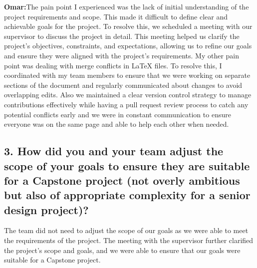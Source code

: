 \documentclass{article}
\begin{document}
\newline
\newline
\textbf{Omar:}The pain point I experienced was the lack of initial understanding of the project requirements and scope. This made it difficult to define clear and achievable goals for the project. To resolve this, we scheduled a meeting with our supervisor to discuss the project in detail. This meeting helped us clarify the project's objectives, constraints, and expectations, allowing us to refine our goals and ensure they were aligned with the project's requirements. My other pain point was dealing with merge conflicts in LaTeX files. To resolve this, I coordinated with my team members to ensure that we were working on separate sections of the document and regularly communicated about changes to avoid overlapping edits. Also we maintained a clear version control strategy to manage contributions effectively while having a pull request review process to catch any potential conflicts early and we were in constant communication to ensure everyone was on the same page and able to help each other when needed.


\subsection*{3. How did you and your team adjust the scope of your goals to ensure they are suitable for a Capstone project (not overly ambitious but also of appropriate complexity for a senior design project)?}
The team did not need to adjust the scope of our goals as we were able to meet the requirements of the project. The meeting with the supervisor further clarified the project's scope and goals, and we were able to ensure that our goals were suitable for a Capstone project.
\end{document}
